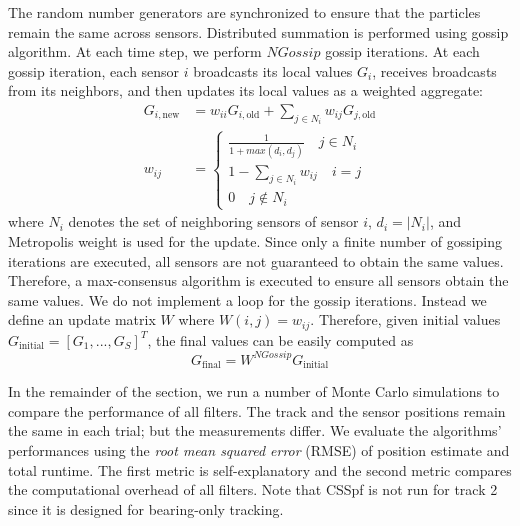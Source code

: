 \documentclass[10pt,letterpaper,final]{article}
\begin{document}
The random number generators are synchronized to ensure that the particles remain the same across sensors. Distributed summation is performed using gossip algorithm. At each time step, we perform $NGossip$ gossip iterations. At each gossip iteration, each sensor $i$ broadcasts its local values $G_i$, receives broadcasts from its neighbors, and then updates its local values as a weighted aggregate:
\begin{align}
G_{i,\text{new}} &= w_{ii}G_{i,\text{old}} + \sum_{j\in N_i}w_{ij}G_{j,\text{old}} \\
w_{ij} &=
\begin{cases}
\frac{1}{1+max(d_i, d_j)} \quad j\in N_i \\
1-\sum_{j\in N_i}w_{ij} \quad i=j \\
0 \quad j\notin N_i
\end{cases}
\label{eqn:metropolis_weight}
\end{align}
where $N_i$ denotes the set of neighboring sensors of sensor $i$, $d_i=|N_i|$, and Metropolis weight is used for the update. Since only a finite number of gossiping iterations are executed, all sensors are not guaranteed to obtain the same values. Therefore, a max-consensus algorithm is executed to ensure all sensors obtain the same values. We do not implement a loop for the gossip iterations. Instead we define an update matrix $W$ where $W(i,j)=w_{ij}$. Therefore, given initial values $G_{\text{initial}}=[G_1,...,G_S]^T$, the final values can be easily computed as 
\begin{equation}
G_{\text{final}} = W^{NGossip}G_{\text{initial}}
\end{equation}

In the remainder of the section, we run a number of Monte Carlo simulations to compare the performance of all filters. The track and the sensor positions remain the same in each trial; but the measurements differ. We evaluate the algorithms' performances using the \textit{root mean squared error} (RMSE) of position estimate and total runtime. The first metric is self-explanatory and the second metric compares the computational overhead of all filters. Note that CSSpf is not run for track 2 since it is designed for bearing-only tracking. 
\end{document}
